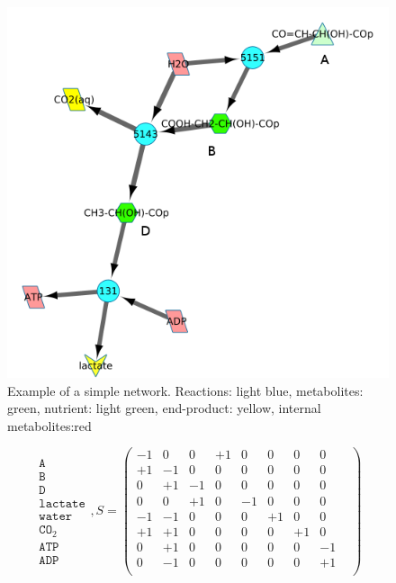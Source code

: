 \documentclass[10pt,a4paper]{article}
\begin{document}
\begin{figure}[t]
	\centering
	\includegraphics[width=0.5\linewidth]{initial_network_ABC.png}
	\caption{Example of a simple network. Reactions: light blue, metabolites: green, nutrient: light green, end-product: yellow, internal metabolites:red}
	\label{fig:examplenetwork}
\end{figure}

	\begin{equation}
	\begin{matrix}
		\texttt{A}   \\
		\texttt{B}\\
		\texttt{D}\\
		\texttt{lactate}\\
		\texttt{water}\\
		\texttt{CO}_2\\
		\texttt{ATP}\\
		\texttt{ADP}
	\end{matrix}
	,S=
	\begin{pmatrix}
			  -1 &  0 &  0 & +1 &  0 &  0 & 0 & 0 & \\ 
			  +1 & -1 &  0 &  0 &  0 &  0 & 0 &0 &  \\ 
			  0 & +1 & -1 &  0 &  0 &  0 & 0 & 0 & \\ 
			  0  &  0 & +1 &  0 & -1 &  0 & 0 & 0 & \\ 
			  -1 & -1 &  0 &  0 &  0 &+1  & 0 & 0 & \\ 
			  +1 & +1 &  0 &  0 &  0 &  0 & +1&0 &  \\ 
			  0 & +1 &  0 &  0 &  0 & 0 &0 & -1 &\\ 
			  0 & -1 &  0 &  0 &  0 & 0 &0 & +1 & \\ 
			  
		\end{pmatrix} 
		\label{eq:examplematrix}
	\end{equation}
\end{document}
